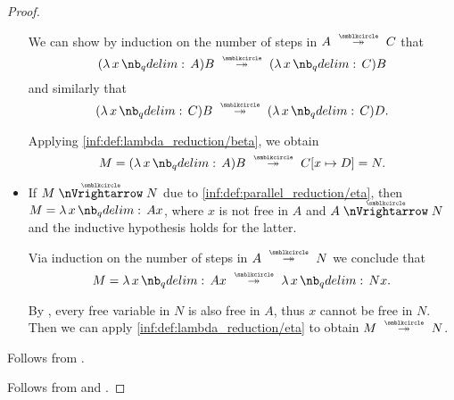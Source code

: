 \begin{proof}
\begin{itemize}
    We can show by induction on the number of steps in \( A \pred* C \) that
    \begin{equation*}
      (\qabs x A)B \pred* (\qabs x C)B
    \end{equation*}
    and similarly that
    \begin{equation*}
      (\qabs x C)B \pred* (\qabs x C)D.
    \end{equation*}

    Applying \ref{inf:def:lambda_reduction/beta}, we obtain
    \begin{equation*}
      M = (\qabs x A) B \pred* C[x \mapsto D] = N.
    \end{equation*}

    \item If \( M \ppred N \) due to \ref{inf:def:parallel_reduction/eta}, then \( M = \qabs x A x \), where \( x \) is not free in \( A \) and \( A \ppred N \) and the inductive hypothesis holds for the latter.

    Via induction on the number of steps in \( A \pred* N \) we conclude that
    \begin{equation*}
      M = \qabs x A x \pred* \qabs x N x.
    \end{equation*}

    By , every free variable in \( N \) is also free in \( A \), thus \( x \) cannot be free in \( N \). Then we can apply \ref{inf:def:lambda_reduction/eta} to obtain \( M \pred* N \).
  \end{itemize}

   Follows from .

   Follows from  and .
\end{proof}

